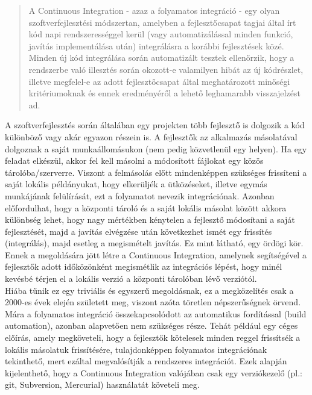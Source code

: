 \begin{quotation}
A Continuous Integration - azaz a folyamatos integráció - egy olyan szoftverfejlesztési módszertan, amelyben a fejlesztőcsapat tagjai által írt kód napi rendszerességgel kerül (vagy automatizálással minden funkció, javítás implementálása után) integrálásra a korábbi fejlesztések közé. Minden új kód integrálása során automatizált tesztek ellenőrzik, hogy a rendszerbe való illesztés során okozott-e valamilyen hibát az új kódrészlet, illetve megfelel-e az adott fejlesztőcsapat által meghatározott minőségi kritériumoknak és ennek eredményéről a lehető leghamarabb visszajelzést ad. \cite{martin_fowler_cont_int}
\end{quotation} 

A szoftverfejlesztés során általában egy projekten több fejlesztő is dolgozik a kód különböző vagy akár egyazon részein is. A fejlesztők az alkalmazás másolatával dolgoznak a saját munkaállomásukon (nem pedig közvetlenül egy helyen). Ha egy feladat elkészül, akkor fel kell másolni a módosított fájlokat egy közös tárolóba/szerverre. Viszont a felmásolás előtt mindenképpen szükséges frissíteni a saját lokális példányukat, hogy elkerüljék a ütközéseket, illetve egymás munkájának felülírását, ezt a folyamatot nevezik integrációnak. Azonban előfordulhat, hogy a központi tároló és a saját lokális másolat között akkora különbség lehet, hogy nagy mértékben kénytelen a fejlesztő módosítani a saját fejlesztését, majd a javítás elvégzése után következhet ismét egy frissítés (integrálás), majd esetleg a megismételt javítás. Ez mint látható, egy ördögi kör. Ennek a megoldására jött létre a Continuous Integration, amelynek segítségével a fejlesztők adott időközönként megismétlik az integrációs lépést, hogy minél kevésbé térjen el a lokális verzió a központi tárolóban lévő verziótól.
\hfill\\
Hiába tűnik ez egy triviális és egyszerű megoldásnak, ez a megközelítés csak a 2000-es évek elején született meg, viszont azóta töretlen népszerűségnek örvend. Mára a folyamatos integráció összekapcsolódott az automatikus fordítással (build automation), azonban alapvetően nem szükséges része. Tehát például egy céges előírás, amely megköveteli, hogy a fejlesztők kötelesek minden reggel frissítsék a lokális másolatuk frissítésére, tulajdonképpen folyamatos integrációnak tekinthető, mert ezáltal megvalósítják a rendszeres integrációt. Ezek alapján kijelenthető, hogy a Continuous Integration valójában csak egy verziókezelő (pl.: git, Subversion, Mercurial) használatát követeli meg.
